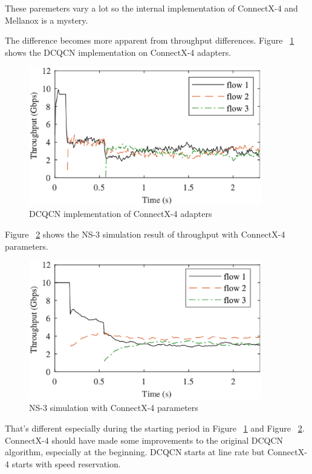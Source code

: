 \documentclass[12pt,a4paper]{article}
\begin{document}
These paremeters vary a lot so the internal implementation of ConnectX-4 and Mellanox is a mystery.

The difference becomes more apparent from throughput differences.
Figure ~\ref{fig:cx4imp} shows the DCQCN implementation on ConnectX-4 adapters.
\begin{figure}[h!]
	\begin{center}
		\includegraphics[width=4in]{cx4imp}
		\caption{DCQCN implementation of ConnectX-4 adapters}
		\label{fig:cx4imp}
	\end{center}
\end{figure}

Figure ~\ref{fig:ns3imp} shows the NS-3 simulation result of throughput with ConnectX-4 parameters.
\begin{figure}[h!]
	\begin{center}
		\includegraphics[width=4in]{ns3imp}
		\caption{NS-3 simulation with ConnectX-4 parameters}
		\label{fig:ns3imp}
	\end{center}
\end{figure}

That's different especially during the starting period in Figure ~\ref{fig:cx4imp} and Figure ~\ref{fig:ns3imp}.
ConnectX-4 should have made some improvements to the original DCQCN algorithm, especially at the beginning.
DCQCN starts at line rate but ConnectX-4 starts with speed reservation.
\end{document}
